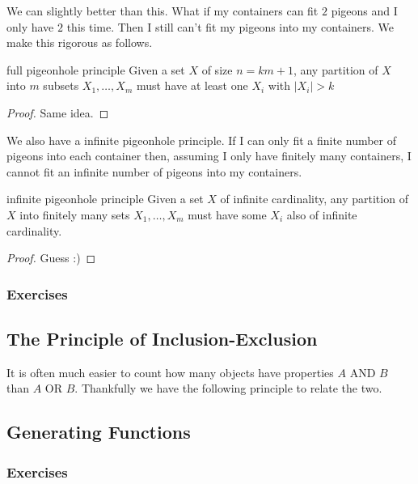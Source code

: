\documentclass{article}
\begin{document}
We can slightly better than this. What if my containers can fit $2$ pigeons and I only have $2$ this time. Then I still can't fit my pigeons 
into my containers. We make this rigorous as follows. 

\begin{theorem}[]{full pigeonhole principle}
    Given a set $X$ of size $n = km+1$, any partition of $X$ into $m$ subsets $X_1, \dots, X_m$ must have at least one $X_i$ with $|X_i| > k$
\end{theorem}

\begin{proof}
    Same idea.
\end{proof}

We also have a infinite pigeonhole principle. If I can only fit a finite number of pigeons into each container then, assuming I only have 
finitely many containers, I cannot fit an infinite number of pigeons into my containers.

\begin{theorem}[]{infinite pigeonhole principle}
    Given a set $X$ of infinite cardinality, any partition of $X$ into finitely many sets $X_1, \dots, X_m$ must have some $X_i$ also of infinite 
    cardinality. 
\end{theorem}

\begin{proof}
    Guess :)
\end{proof}

\subsubsection*{Exercises}

\newpage

\subsection{The Principle of Inclusion-Exclusion}

It is often much easier to count how many objects have properties $A$ AND $B$ than $A$ OR $B$. Thankfully we have the following principle to 
relate the two.

\newpage

\subsection{Generating Functions}

\subsubsection*{Exercises}
\end{document}
